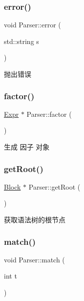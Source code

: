 \subsubsection{\texorpdfstring{error()}{error()}}
{\footnotesize\ttfamily void Parser\+::error (\begin{DoxyParamCaption}\item[{std\+::string}]{s }\end{DoxyParamCaption})\hspace{0.3cm}{\ttfamily [protected]}}



抛出错误 

\mbox{\label{class_parser_ac85a997e91604de1d3505b3c8aaddf3b}} 
\subsubsection{\texorpdfstring{factor()}{factor()}}
{\footnotesize\ttfamily \hyperlink{class_expr}{Expr} $\ast$ Parser\+::factor (\begin{DoxyParamCaption}{ }\end{DoxyParamCaption})\hspace{0.3cm}{\ttfamily [protected]}}



生成 因子 对象 

\mbox{\label{class_parser_ad05b2f1f2e9f60a7373961da0588eb5b}} 
\subsubsection{\texorpdfstring{get\+Root()}{getRoot()}}
{\footnotesize\ttfamily \hyperlink{class_block}{Block} $\ast$ Parser\+::get\+Root (\begin{DoxyParamCaption}{ }\end{DoxyParamCaption})}



获取语法树的根节点 

\mbox{\label{class_parser_a009517efe4fe90b136071179beb32360}} 
\subsubsection{\texorpdfstring{match()}{match()}}
{\footnotesize\ttfamily void Parser\+::match (\begin{DoxyParamCaption}\item[{int}]{t }\end{DoxyParamCaption})\hspace{0.3cm}{\ttfamily [protected]}}



